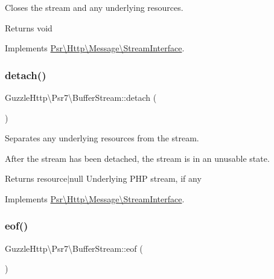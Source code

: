 Closes the stream and any underlying resources.

\begin{DoxyReturn}{Returns}
void 
\end{DoxyReturn}


Implements \hyperlink{interfacePsr_1_1Http_1_1Message_1_1StreamInterface_a0bbd0c821da0ee0c319f9867ff77c598}{Psr\textbackslash{}\+Http\textbackslash{}\+Message\textbackslash{}\+Stream\+Interface}.

\mbox{\label{classGuzzleHttp_1_1Psr7_1_1BufferStream_ae378709ce9283164cafbfe1b1fcf4190}} 
\subsubsection{\texorpdfstring{detach()}{detach()}}
{\footnotesize\ttfamily Guzzle\+Http\textbackslash{}\+Psr7\textbackslash{}\+Buffer\+Stream\+::detach (\begin{DoxyParamCaption}{ }\end{DoxyParamCaption})}

Separates any underlying resources from the stream.

After the stream has been detached, the stream is in an unusable state.

\begin{DoxyReturn}{Returns}
resource$\vert$null Underlying P\+HP stream, if any 
\end{DoxyReturn}


Implements \hyperlink{interfacePsr_1_1Http_1_1Message_1_1StreamInterface_a1670dba880a8c14690746732960d4c9c}{Psr\textbackslash{}\+Http\textbackslash{}\+Message\textbackslash{}\+Stream\+Interface}.

\mbox{\label{classGuzzleHttp_1_1Psr7_1_1BufferStream_a41a46baafe72165dc167b7fd5e4053ae}} 
\subsubsection{\texorpdfstring{eof()}{eof()}}
{\footnotesize\ttfamily Guzzle\+Http\textbackslash{}\+Psr7\textbackslash{}\+Buffer\+Stream\+::eof (\begin{DoxyParamCaption}{ }\end{DoxyParamCaption})}

